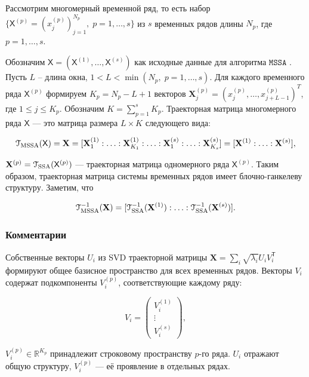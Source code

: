 \documentclass[12pt, specialist, subf
]{disser}
\theoremstyle{definition}
\newcommand{\MSSA}{\texttt{MSSA}}
\newcommand{\TS}{\mathsf{X}}
\begin{document}
Рассмотрим многомерный временной ряд, то есть набор $\{\TS^{(p)} = \left({x^{(p)}_{j}}\right) _{j=1}^{N_p}, \; p = 1, \ldots, s\}$ из $s$ временных рядов длины $N_p$, где $p = 1, \ldots, s$.

Обозначим $\TS = (\TS^{(1)}, \ldots, \TS^{(s)})$ как исходные данные для алгоритма $\MSSA$ \cite{ssa_with_R}. Пусть $L$ -- длина окна, $1 < L < \min(N_p, \; p = 1, \ldots, s)$. Для каждого временного ряда $\TS^{(p)}$ формируем $K_p = N_p - L + 1$ векторов $\mathbf{X}_j^{(p)} = (x_j^{(p)}, \ldots, x_{j+L-1}^{(p)})^T$, где $1 \leq j \leq K_p$. Обозначим $K = \sum_{p=1}^s K_p$. Траекторная матрица многомерного ряда $\TS$ — это матрица размера $L \times K$ следующего вида:

\[
	\EuScript{T}_{\text{MSSA}}(\TS) = \mathbf{X} = [\mathbf{X}_1^{(1)} : \ldots : \mathbf{X}_{K_1}^{(1)} : \ldots : \mathbf{X}_1^{(s)} : \ldots : \mathbf{X}_{K_s}^{(s)}] = [\mathbf{X}^{(1)} : \ldots : \mathbf{X}^{(s)}],
\]

$\mathbf{X}^{(p)} = \EuScript{T}_{\text{SSA}}(\TS^{(p)})$ — траекторная матрица одномерного ряда $\TS^{(p)}$. Таким образом, траекторная матрица системы временных рядов имеет блочно-ганкелеву структуру. Заметим, что

\[
	\EuScript{T}^{-1}_{\text{MSSA}}(\mathbf{X}) = [\EuScript{T}^{-1}_{\text{SSA}}(\mathbf{X}^{(1)}) : \ldots : \EuScript{T}^{-1}_{\text{SSA}}(\mathbf{X}^{(s)})].
\]



\subsubsection{Комментарии}


Собственные векторы $U_i$ из SVD траекторной матрицы $\mathbf{X} = \sum_i \sqrt{\lambda_i} U_i V_i^{\mathsf{T}}$ формируют общее базисное пространство для всех временных рядов. Векторы $V_i$ содержат подкомпоненты $V_i^{(p)}$, соответствующие каждому ряду:

\begin{equation*}
	V_i = \begin{pmatrix} V_i^{(1)} \\ \vdots \\ V_i^{(s)} \end{pmatrix},
\end{equation*}

$V_i^{(p)} \in \mathbb{R}^{K_p}$ принадлежит строковому пространству $p$-го ряда. $U_i$ отражают общую структуру, $V_i^{(p)}$ — её проявление в отдельных рядах.
\end{document}
